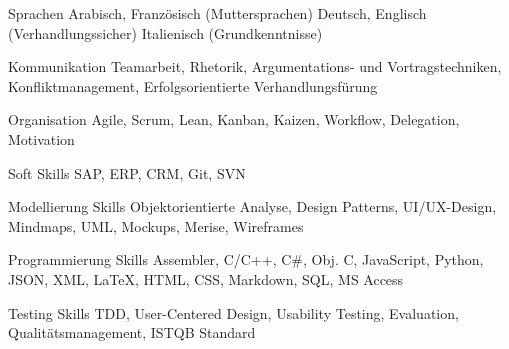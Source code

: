 


\begin{cvskills}


\cvskill
{Sprachen} %
{Arabisch, Franz\"osisch (Muttersprachen) {\cdotp} Deutsch, Englisch (Verhandlungssicher) {\cdotp} Italienisch (Grundkenntnisse)} %


\cvskill
{Kommunikation} %
{Teamarbeit, Rhetorik, Argumentations- und Vortragstechniken, Konfliktmanagement, Erfolgsorientierte Verhandlungsf\"urung} %


\cvskill
{Organisation} %
{Agile, Scrum, Lean, Kanban, Kaizen, Workflow, Delegation, Motivation} %


\cvskill
{Soft Skills} %
{SAP, ERP, CRM, Git, SVN} %


\cvskill
{Modellierung Skills} %
{Objektorientierte Analyse, Design Patterns, UI/UX-Design, Mindmaps, UML, Mockups, Merise, Wireframes} %


\cvskill
{Programmierung Skills} %
{Assembler, C/C++, C\#, Obj. C, JavaScript, Python, JSON, XML, LaTeX, HTML, CSS, Markdown, SQL, MS Access} %


\cvskill
{Testing Skills} %
{TDD, User-Centered Design, Usability Testing, Evaluation, Qualit\"atsmanagement, ISTQB Standard} %


\end{cvskills}